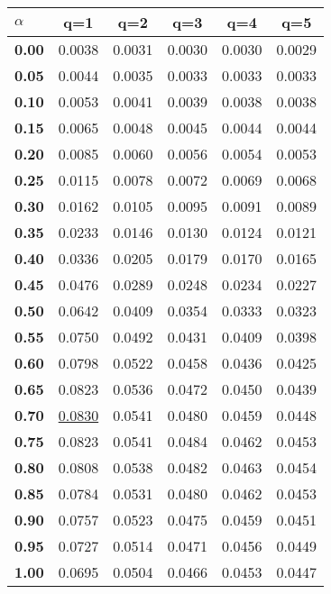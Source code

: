 \begin{tabular}{ | l || c | c | c | c | c |}
\hline
\textbf{$\alpha$} & \textbf{}q=1} & \textbf{}q=2} & \textbf{}q=3} & \textbf{}q=4} & \textbf{}q=5} \\
\hline
\textbf{0.00} & 0.0038 & 0.0031 & 0.0030 & 0.0030 & 0.0029\\
\hline
\textbf{0.05} & 0.0044 & 0.0035 & 0.0033 & 0.0033 & 0.0033\\
\hline
\textbf{0.10} & 0.0053 & 0.0041 & 0.0039 & 0.0038 & 0.0038\\
\hline
\textbf{0.15} & 0.0065 & 0.0048 & 0.0045 & 0.0044 & 0.0044\\
\hline
\textbf{0.20} & 0.0085 & 0.0060 & 0.0056 & 0.0054 & 0.0053\\
\hline
\textbf{0.25} & 0.0115 & 0.0078 & 0.0072 & 0.0069 & 0.0068\\
\hline
\textbf{0.30} & 0.0162 & 0.0105 & 0.0095 & 0.0091 & 0.0089\\
\hline
\textbf{0.35} & 0.0233 & 0.0146 & 0.0130 & 0.0124 & 0.0121\\
\hline
\textbf{0.40} & 0.0336 & 0.0205 & 0.0179 & 0.0170 & 0.0165\\
\hline
\textbf{0.45} & 0.0476 & 0.0289 & 0.0248 & 0.0234 & 0.0227\\
\hline
\textbf{0.50} & 0.0642 & 0.0409 & 0.0354 & 0.0333 & 0.0323\\
\hline
\textbf{0.55} & 0.0750 & 0.0492 & 0.0431 & 0.0409 & 0.0398\\
\hline
\textbf{0.60} & 0.0798 & 0.0522 & 0.0458 & 0.0436 & 0.0425\\
\hline
\textbf{0.65} & 0.0823 & 0.0536 & 0.0472 & 0.0450 & 0.0439\\
\hline
\textbf{0.70} & \underline{0.0830} & 0.0541 & 0.0480 & 0.0459 & 0.0448\\
\hline
\textbf{0.75} & 0.0823 & 0.0541 & 0.0484 & 0.0462 & 0.0453\\
\hline
\textbf{0.80} & 0.0808 & 0.0538 & 0.0482 & 0.0463 & 0.0454\\
\hline
\textbf{0.85} & 0.0784 & 0.0531 & 0.0480 & 0.0462 & 0.0453\\
\hline
\textbf{0.90} & 0.0757 & 0.0523 & 0.0475 & 0.0459 & 0.0451\\
\hline
\textbf{0.95} & 0.0727 & 0.0514 & 0.0471 & 0.0456 & 0.0449\\
\hline
\textbf{1.00} & 0.0695 & 0.0504 & 0.0466 & 0.0453 & 0.0447\\
\hline
\end{tabular}
